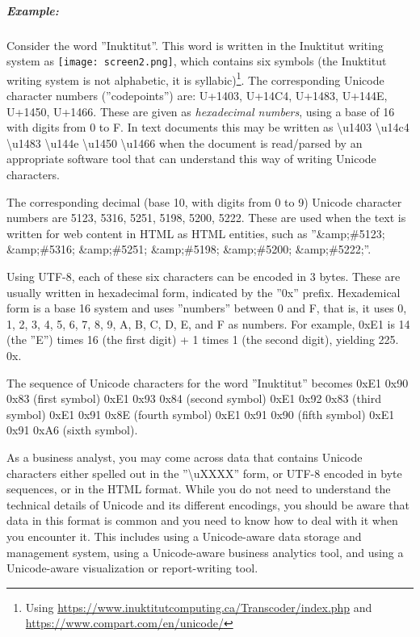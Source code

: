 \subparagraph*{Example:} Consider the word ''Inuktitut''. This word is written in the Inuktitut writing system as \texttt{[image: screen2.png]}, which contains six symbols (the Inuktitut writing system is not alphabetic, it is syllabic)\footnote{Using \url{https://www.inuktitutcomputing.ca/Transcoder/index.php} and \url{https://www.compart.com/en/unicode/}}. The corresponding Unicode character numbers (''codepoints'') are: U+1403, U+14C4, U+1483, U+144E, U+1450, U+1466. These are given as \emph{hexadecimal numbers}, using a base of 16 with digits from 0 to F. In text documents this may be written as \textbackslash u1403 \textbackslash u14c4 \textbackslash u1483 \textbackslash u144e \textbackslash u1450 \textbackslash u1466 when the document is read/parsed by an appropriate software tool that can understand this way of writing Unicode characters. 

The corresponding decimal (base 10, with digits from 0 to 9) Unicode character numbers are 5123, 5316, 5251, 5198, 5200, 5222. These are used when the text is written for web content in HTML as HTML entities, such as ''\&amp;\#5123; \&amp;\#5316; \&amp;\#5251; \&amp;\#5198; \&amp;\#5200; \&amp;\#5222;''.

Using UTF-8, each of these six characters can be encoded in 3 bytes. These are usually written in hexadecimal form, indicated by the ''0x'' prefix. Hexademical form is a base 16 system and uses ''numbers'' between 0 and F, that is, it uses 0, 1, 2, 3, 4, 5, 6, 7, 8, 9, A, B, C, D, E, and F as numbers. For example, 0xE1 is 14 (the ''E'') times 16 (the first digit) + 1 times 1 (the second digit), yielding 225. 0x. 

The sequence of Unicode characters for the word ''Inuktitut'' becomes 0xE1 0x90 0x83 (first symbol) 0xE1 0x93 0x84 (second symbol) 0xE1 0x92 0x83 (third symbol) 0xE1 0x91 0x8E (fourth symbol) 0xE1 0x91 0x90 (fifth symbol) 0xE1 0x91 0xA6 (sixth symbol). 

As a business analyst, you may come across data that contains Unicode characters either spelled out in the ''\textbackslash uXXXX'' form, or UTF-8 encoded in byte sequences, or in the HTML format. While you do not need to understand the technical details of Unicode and its different encodings, you should be aware that data in this format is common and you need to know how to deal with it when you encounter it. This includes using a Unicode-aware data storage and management system, using a Unicode-aware business analytics tool, and using a Unicode-aware visualization or report-writing tool.

